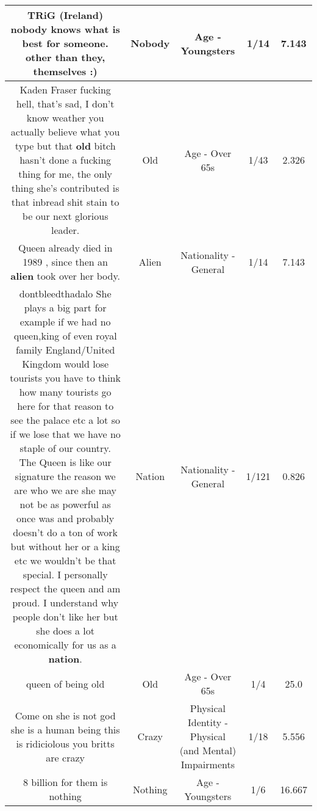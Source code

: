 \documentclass[11pt]{article}
\newlength\mylength
\begin{document}
\begin{center}
\begin{longtable}{|C{.65\mylength}|C{.30\mylength}|C{.12\mylength}|C{.12\mylength}|C{.12\mylength}|}
  \small TRiG (Ireland)  \textbf{nobody} knows what is best for someone. other than they, themselves :)\normalsize   & Nobody & Age - Youngsters & 1/14 & 7.143 \\  \hline
  \small Kaden Fraser fucking hell, that's sad, I don't know weather you actually believe what you type but that \textbf{old} bitch hasn't done a fucking thing for me, the only thing she's contributed is that inbread shit stain to be our next glorious leader.\normalsize   & Old & Age - Over 65s & 1/43 & 2.326 \\  \hline
  \small Queen already died in 1989 , since then an \textbf{alien} took over her body.\normalsize   & Alien & Nationality - General & 1/14 & 7.143 \\  \hline
  \small dontbleedthadalo She plays a big part for example if we had no queen,king of even royal family England/United Kingdom would lose tourists you have to think how many tourists go here for that reason to see the palace etc a lot so if we lose that we have no staple of our country. The Queen is like our signature the reason we are who we are she may not be as powerful as once was and probably doesn't do a ton of work but without her or a king etc we wouldn't be that special. I personally respect the queen and am proud. I understand why people don't like her but she does a lot economically for us as a \textbf{nation}.\normalsize   & Nation & Nationality - General & 1/121 & 0.826 \\  \hline
  \small queen of being old\normalsize   & Old & Age - Over 65s & 1/4 & 25.0 \\  \hline
  \small Come on she is not god she is a human being this is ridiciolous you britts are crazy\normalsize   & Crazy & Physical Identity - Physical (and Mental) Impairments & 1/18 & 5.556 \\  \hline
  \small 8 billion for them is nothing\normalsize   & Nothing & Age - Youngsters & 1/6 & 16.667 \\  \hline

\end{longtable}
\end{center}
\end{document}
